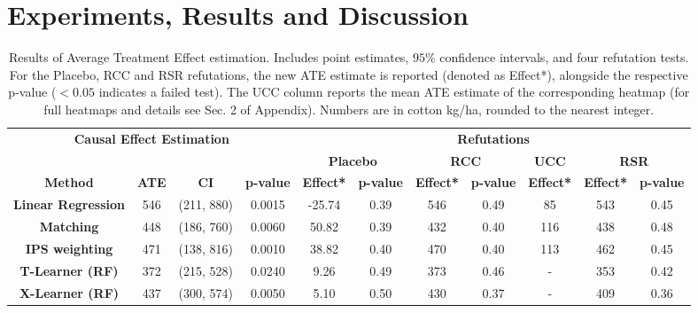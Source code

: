 \documentclass[letterpaper]{article} %
\begin{document}
\section{Experiments, Results and Discussion}

\begin{table}[!ht]
\small
\centering
\begin{tabular}{cccccccccccc}
\toprule
\multicolumn{4}{c}{\multirow{2}{*}{\textbf{Causal Effect Estimation}}} & \multicolumn{8}{c}{\textbf{Refutations}}                                              \\ \cmidrule(l){5-12}
\multicolumn{4}{c}{} &
\multicolumn{2}{c}{\textbf{Placebo}} &
\multicolumn{2}{c}{\textbf{RCC}} &
\multicolumn{2}{c}{\textbf{UCC}} &
\multicolumn{2}{c}{\textbf{RSR}} \\ \midrule
\textbf{Method} & \textbf{ATE} & \textbf{CI} &  \textbf{p-value}
& \textbf{Effect*} & \textbf{p-value} & \textbf{Effect*} &
\textbf{p-value} &   \multicolumn{2}{c}{\textbf{Effect*}} &
\textbf{Effect*} & \textbf{p-value} \\
\midrule
\textbf{Linear Regression}   & 546   & (211, 880)   & 0.0015  & -25.74 & 0.39 & 546 & 0.49  & \multicolumn{2}{c}{85} & 543 & 0.45 \\
\textbf{Matching}            & 448   & (186, 760)   & 0.0060   & 50.82 & 0.39 & 432  & 0.40 & \multicolumn{2}{c}{116} & 438 & 0.48 \\
\textbf{IPS weighting} &  471 &  (138, 816) &  0.0010 &  38.82 &  0.40 &  470 &  0.40 &  \multicolumn{2}{c}{113} &  462 &  0.45 \\
\textbf{T-Learner (RF)}      & 372   & (215, 528)   & 0.0240 & 9.26  & 0.49 & 373 & 0.46 & \multicolumn{2}{c}{-} & 353 & 0.42 \\
\textbf{X-Learner (RF)}      & 437   & (300, 574)   & 0.0050 & 5.10   & 0.50 & 430 & 0.37 & \multicolumn{2}{c}{-} & 409    & 0.36 \\ \bottomrule
\end{tabular}
\caption{Results of Average Treatment Effect estimation. Includes point estimates, $95\%$ confidence intervals, and four refutation tests. For the Placebo, RCC and RSR refutations, the new ATE estimate is reported (denoted as Effect*), alongside the respective p-value ($<0.05$ indicates a failed test). The UCC column reports the mean ATE estimate of the corresponding heatmap (for full heatmaps and details see Sec. 2 of Appendix). Numbers are in cotton kg/ha, rounded to the nearest integer.}
\label{tab:results}
\end{table}
\end{document}
